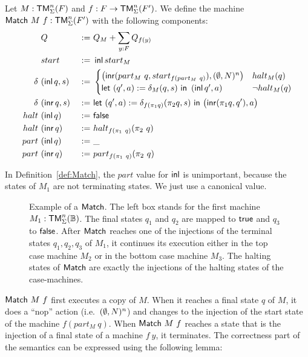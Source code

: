 \begin{definition}[$\MS{Match}~M~f$][Match]
  \label{def:Match}
  Let $M : \mathsf{TM}_\Sigma^n(F)$ and $f : F \rightarrow \mathsf{TM}_\Sigma^n(F')$.  We define the machine $\mathsf{Match}~M~f : \mathsf{TM}_\Sigma^n(F')$ with the following
  components:
  \begin{alignat*}{3}
    & Q                  &~:=~& Q_M +  \sum_{y:F} Q_{f(y)} \\
    & start              &~:=~& \operatorname{\mathsf{inl}} start_M \\
    \delta ~&(\operatorname{\mathsf{inl}} q, s) &~:=~&
    \begin{cases}
      \bigl(\operatorname{\mathsf{inr}} (part_M~q, start_{f (part_M~q)}), (\emptyset, N)^n \bigr) & halt_M(q) \\
      \mathsf{let}~(q', a) := \delta_M(q, s)~\mathsf{in}~\left(\operatorname{\mathsf{inl}} q', a \right) & \lnot halt_M(q)
    \end{cases} \\
    \delta ~&(\operatorname{\mathsf{inr}} q, s) &~:=~& \mathsf{let}~(q', a) := \delta_{f(\pi_1 q)} (\pi_2 q, s)~\mathsf{in}~\bigl( \operatorname{\mathsf{inr}} (\pi_1 q, q'), a \bigr) \\
    halt   ~&(\operatorname{\mathsf{inl}}  q)   &~:=~& \mathsf{false} \\
    halt   ~&(\operatorname{\mathsf{inr}}  q)   &~:=~& halt_{f(\pi_1~q)} (\pi_2~q) \\
    part   ~&(\operatorname{\mathsf{inl}}  q)   &~:=~& \_ \\
    part   ~&(\operatorname{\mathsf{inr}}  q)   &~:=~& part_{f(\pi_1~q)} (\pi_2~q)
  \end{alignat*}
\end{definition}

In Definition~\ref{def:Match}, the $part$ value for $\operatorname{\mathsf{inl}}$ is unimportant, because the states of $M_1$ are not terminating states.  We just use a
canonical value.

\begin{figure}
  \center
  
  \caption{Example of a $\mathsf{Match}$.  The left box stands for the first machine $M_1:\mathsf{TM}_\Sigma^n(\mathbb{B})$.  The final states $q_1$ and $q_2$ are
    mapped to $\mathsf{true}$ and $q_3$ to $\mathsf{false}$.  After $\mathsf{Match}$ reaches one of the injections of the terminal states $q_1, q_2, q_3$ of $M_1$, it
    continues its execution either in the top case machine $M_2$ or in the bottom case machine $M_3$.  The halting states of $\mathsf{Match}$ are exactly
    the injections of the halting states of the case-machines.}
  \label{fig:match}
\end{figure}

$\MS{Match}~M~f$ first executes a copy of $M$.  When it reaches a final state $q$ of $M$, it does a ``nop'' action (i.e.\ $(\emptyset,N)^n$) and changes
to the injection of the start state of the machine $f(part_M~q)$.  When $\MS{Match}~M~f$ reaches a state that is the injection of a final state of a
machine $f~y$, it terminates.  The correctness part of the semantics can be expressed using the following lemma:

